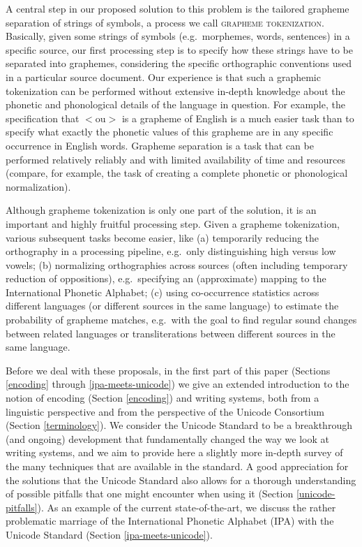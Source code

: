 A central step in our proposed solution to this problem is the tailored grapheme
separation of strings of symbols, a process we call \textsc{grapheme
tokenization}. Basically, given some strings of symbols (e.g.~morphemes, words,
sentences) in a specific source, our first processing step is to specify how
these strings have to be separated into graphemes, considering the specific
orthographic conventions used in a particular source document. Our experience is
that such a graphemic tokenization can be performed without extensive in-depth
knowledge about the phonetic and phonological details of the language in
question. For example, the specification that $<$ou$>$ is a grapheme of English
is a much easier task than to specify what exactly the phonetic values of this
grapheme are in any specific occurrence in English words. Grapheme separation is
a task that can be performed relatively reliably and with limited availability
of time and resources (compare, for example, the task of creating a complete
phonetic or phonological normalization).

Although grapheme tokenization is only one part of the solution, it is an
important and highly fruitful processing step. Given a grapheme tokenization,
various subsequent tasks become easier, like (a) temporarily reducing the
orthography in a processing pipeline, e.g.~only distinguishing high versus low
vowels; (b) normalizing orthographies across sources (often including temporary
reduction of oppositions), e.g.~specifying an (approximate) mapping to the
International Phonetic Alphabet; (c) using co-occurrence statistics across
different languages (or different sources in the same language) to estimate the
probability of grapheme matches, e.g.~with the goal to find regular sound
changes between related languages or transliterations between different sources
in the same language.

Before we deal with these proposals, in the first part of this paper (Sections
\ref{encoding} through \ref{ipa-meets-unicode}) we give an extended introduction
to the notion of encoding (Section \ref{encoding}) and writing systems, both
from a linguistic perspective and from the perspective of the Unicode Consortium
(Section \ref{terminology}). We consider the Unicode Standard to be a
breakthrough (and ongoing) development that fundamentally changed the way we
look at writing systems, and we aim to provide here a slightly more in-depth
survey of the many techniques that are available in the standard. A good
appreciation for the solutions that the Unicode Standard also allows for a
thorough understanding of possible pitfalls that one might encounter when using
it (Section \ref{unicode-pitfalls}). As an example of the current
state-of-the-art, we discuss the rather problematic marriage of the
International Phonetic Alphabet (IPA) with the Unicode Standard (Section
\ref{ipa-meets-unicode}).

